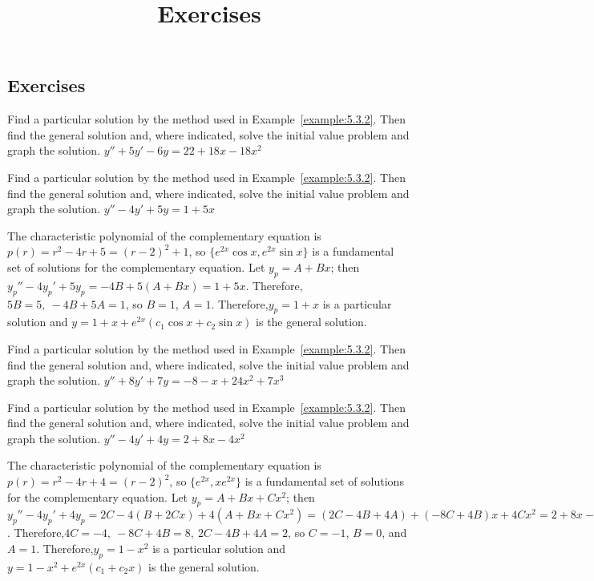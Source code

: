 \documentclass{ximera}
\title{Exercises} \license{CC BY-NC-SA 4.0}
\begin{document}
\begin{abstract}
\end{abstract}
\maketitle

\begin{onlineOnly}
\section*{Exercises}
\end{onlineOnly}



\begin{problem}\label{exer:5.3.1} Find a
particular solution  by the method used in
Example~\ref{example:5.3.2}. Then find the general
solution and, where indicated, solve the initial value problem
and graph the solution. 
$y''+5y'-6y=22+18x-18x^2$
\end{problem}

\begin{problem}\label{exer:5.3.2} Find a
particular solution  by the method used in
Example~\ref{example:5.3.2}. Then find the general
solution and, where indicated, solve the initial value problem
and graph the solution. $y''-4y'+5y=1+5x$
\begin{solution}
The characteristic polynomial of the complementary equation is
$p(r)=r^2-4r+5=(r-2)^2+1$, so
$\{e^{2x}\cos x,e^{2x}\sin x\}$
is a fundamental set of solutions for the complementary equation.
Let $y_p=A+Bx$; then
$y_p''-4y_p'+5y_p=-4B+5(A+Bx)=1+5x$.
Therefore,$5B=5,\  -4B+5A=1$, so $B=1$, $A=1$.
Therefore,$y_p=1+x$ is a particular solution and
$y=1+x+e^{2x}(c_1\cos x+c_2\sin x)$ is the general solution.
\end{solution}
\end{problem}

\begin{problem}\label{exer:5.3.3} Find a
particular solution  by the method used in
Example~\ref{example:5.3.2}. Then find the general
solution and, where indicated, solve the initial value problem
and graph the solution. $y''+8y'+7y=-8-x+24x^2+7x^3$
\end{problem}

\begin{problem}\label{exer:5.3.4} Find a
particular solution  by the method used in
Example~\ref{example:5.3.2}. Then find the general
solution and, where indicated, solve the initial value problem
and graph the solution. $y''-4y'+4y=2+8x-4x^2$
\begin{solution}
The characteristic polynomial of the complementary equation is
$p(r)=r^2-4r+4=(r-2)^2$, so  $\{e^{2x},xe^{2x}\}$
is a fundamental set of solutions for the complementary equation.
Let $y_p=A+Bx+Cx^2$; then
$y_p''-4y_p'+4y_p=2C-4(B+2Cx)+4(A+Bx+Cx^2)=(2C-4B+4A)+(-8C+4B)x+4Cx^2
=2+8x-4x^2$. Therefore,$4C=-4,\ -8C+4B=8,\
2C-4B+4A=2$, so $C=-1$, $B=0$, and $A=1$.
Therefore,$y_p=1-x^2$ is a particular solution and
 $y=1-x^2+e^{2x}(c_1+c_2x)$ is the general solution.
\end{solution}
\end{problem}
\end{document}
